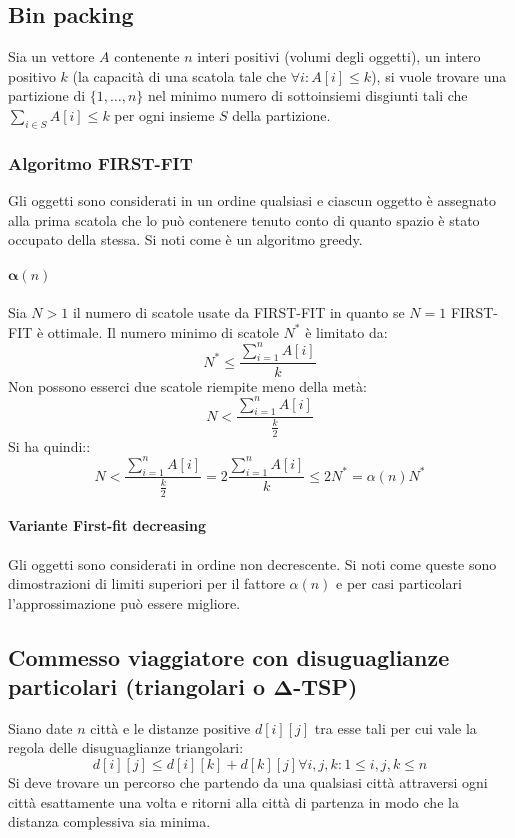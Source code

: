 \subsection{Bin packing}
Sia un vettore $A$ contenente $n$ interi positivi (volumi degli oggetti), un intero positivo $k$ (la capacit\`a di una scatola tale che $\forall i:A[i]\le k$), si vuole trovare una
partizione di $\{1, \dots, n\}$ nel minimo numero di sottoinsiemi disgiunti tali che $\sum\limits_{i\in S}A[i]\le k$ per ogni insieme $S$ della partizione. 	
\subsubsection{Algoritmo FIRST-FIT}
Gli oggetti sono considerati in un ordine qualsiasi e ciascun oggetto \`e assegnato alla prima scatola che lo pu\`o contenere tenuto conto di quanto spazio \`e stato occupato della 
stessa. Si noti come \`e un algoritmo greedy. 
\paragraph{$\mathbf{\alpha}(n)$}
Sia $N>1$ il numero di scatole usate da FIRST-FIT in quanto se $N=1$ FIRST-FIT \`e ottimale. Il numero minimo di scatole $N^*$ \`e limitato da:
$$N^*\le\dfrac{\sum\limits_{i = 1}^n A[i]}{k}$$
Non possono esserci due scatole riempite meno della met\`a:
$$N<\dfrac{\sum\limits_{i = 1}^n A[i]}{\frac{k}{2}}$$
Si ha quindi::
$$N<\dfrac{\sum\limits_{i = 1}^n A[i]}{\frac{k}{2}}=2\dfrac{\sum\limits_{i = 1}^n A[i]}{k}\le 2N^*=\alpha(n)N^*$$
\paragraph{Variante First-fit decreasing}
Gli oggetti sono considerati in ordine non decrescente. Si noti come queste sono dimostrazioni di limiti superiori per il fattore $\alpha(n)$ e per casi particolari l'approssimazione
pu\`o essere migliore. 
\subsection{Commesso viaggiatore con disuguaglianze particolari (triangolari o $\mathbf{\Delta}$-TSP)}
Siano date $n$ citt\`a e le distanze positive $d[i][j]$ tra esse tali per cui vale la regola delle disuguaglianze triangolari:
$$d[i][j]\le d[i][k]+d[k][j] \forall i, j, k: 1\le i, j, k\le n$$
Si deve trovare un percorso che partendo da una qualsiasi citt\`a attraversi ogni citt\`a esattamente una volta e ritorni alla citt\`a di partenza in modo che la distanza complessiva 
sia minima. 
